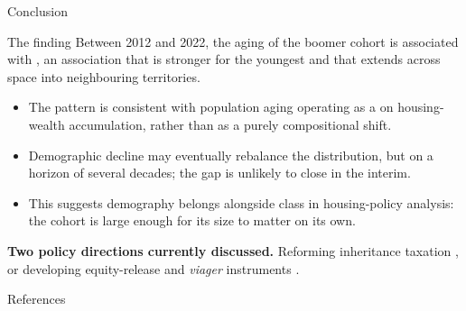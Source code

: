 \documentclass[aspectratio=169]{beamer}
\begin{document}
\begin{frame}{Conclusion}
    \begin{block}{The finding}
        Between 2012 and 2022, the aging of the boomer cohort is associated with
        , an
        association that is stronger for the youngest and that extends across
        space into neighbouring territories.
    \end{block}

    \begin{itemize}
        \item The pattern is consistent with population aging operating as a
               on housing-wealth accumulation, rather
              than as a purely compositional shift.
        \item Demographic decline may eventually rebalance the distribution, but
              on a horizon of several decades; the gap is unlikely to close in
              the interim.
        \item This suggests demography belongs alongside class in housing-policy
              analysis: the cohort is large enough for its size to matter on its
              own.
    \end{itemize}

    \vspace{0.2em}
    \textbf{Two policy directions currently discussed.} Reforming inheritance
    taxation \citep{Dherbecourt2021_repenser_heritage}, or developing
    equity-release and \emph{viager} instruments
    \citep{Coulomb2021_viager_territoires, Coulomb2025_epargne_capturee}.
\end{frame}

\begin{frame}{References}
    \tiny
    
\end{frame}
\end{document}
